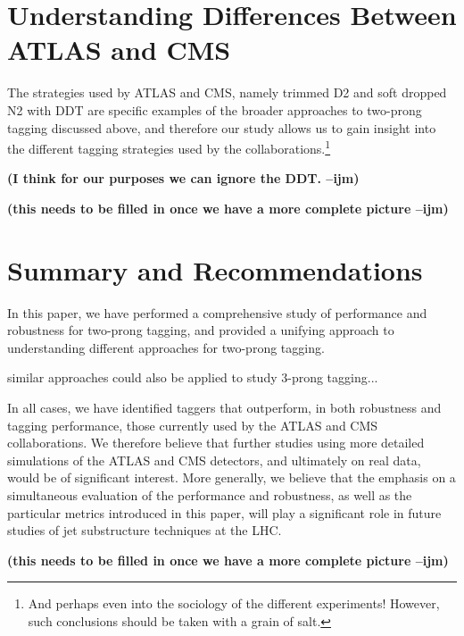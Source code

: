 \documentclass[11pt,letterpaper]{article}
\newcommand{\ijm}[1]{\textbf{\textcolor{llblue}{(#1 --ijm)}}}
\begin{document}
\section{Understanding Differences Between ATLAS and CMS}\label{sec:exp_compare}

The strategies used by ATLAS and CMS, namely trimmed  D2 \cite{Larkoski:2015kga}\cite{Larkoski:2014gra} and soft dropped N2 \cite{Moult:2016cvt} with DDT \cite{Dolen:2016kst} are specific examples of the broader approaches to two-prong tagging discussed above, and therefore our study allows us to gain insight into the different tagging strategies used by the collaborations.\footnote{And perhaps even into the sociology of the different experiments! However, such conclusions should be taken with a grain of salt.}

\ijm{I think for our purposes we can ignore the DDT. }

\ijm{this needs to be filled in once we have a more complete picture}


\section{Summary and Recommendations}\label{sec:conc}

In this paper, we have performed a comprehensive study of performance and robustness for two-prong tagging, and provided a unifying approach to understanding different approaches for two-prong tagging. 

similar approaches could also be applied to study $3$-prong tagging...


In all cases, we have identified taggers that outperform, in both robustness and tagging performance, those currently used by the ATLAS and CMS collaborations. We therefore believe that further studies using more detailed simulations of the ATLAS and CMS detectors, and ultimately on real data, would be of significant interest. More generally, we believe that the emphasis on a simultaneous evaluation of the performance and robustness, as well as the particular metrics introduced in this paper, will play a significant role in future studies of jet substructure techniques at the LHC.

\ijm{this needs to be filled in once we have a more complete picture}
\end{document}

